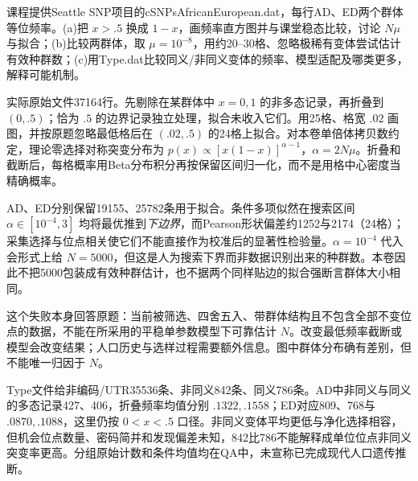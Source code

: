 \begin{exercise}
课程提供Seattle SNP项目的cSNPsAfricanEuropean.dat，每行AD、ED两个群体等位频率。(a)把 $x>.5$ 换成 $1-x$，画频率直方图并与课堂稳态比较，讨论 $N\mu$ 与拟合；(b)比较两群体，取 $\mu=10^{-8}$，用约20--30格、忽略极稀有变体尝试估计有效种群数；(c)用Type.dat比较同义/非同义变体的频率、模型适配及哪类更多，解释可能机制。
\end{exercise}
\begin{solution}
实际原始文件37164行。先剔除在某群体中 $x=0,1$ 的非多态记录，再折叠到 $(0,.5)$；恰为 $.5$ 的边界记录独立处理，拟合未收入它们。用25格、格宽 $.02$ 画图，并按原题忽略最低格后在 $(.02,.5)$ 的24格上拟合。对本卷单倍体拷贝数约定，理论零选择对称突变分布为 $p(x)\propto[x(1-x)]^{\alpha-1}$，$\alpha=2N\mu$。折叠和截断后，每格概率用Beta分布积分再按保留区间归一化，而不是用格中心密度当精确概率。
\begin{center}\end{center}
AD、ED分别保留19155、25782条用于拟合。条件多项似然在搜索区间 $\alpha\in[10^{-4},3]$ 均将最优推到\emph{下边界}，而Pearson形状偏差约1252与2174（24格）；采集选择与位点相关使它们不能直接作为校准后的显著性检验量。$\alpha=10^{-4}$ 代入会形式上给 $N=5000$，但这是人为搜索下界而非数据识别出来的种群数。本卷因此不把5000包装成有效种群估计，也不据两个同样贴边的拟合强断言群体大小相同。

这个失败本身回答原题：当前被筛选、四舍五入、带群体结构且不包含全部不变位点的数据，不能在所采用的平稳单参数模型下可靠估计 $N$。改变最低频率截断或模型会改变结果；人口历史与选样过程需要额外信息。图中群体分布确有差别，但不能唯一归因于 $N$。

Type文件给非编码/UTR35536条、非同义842条、同义786条。AD中非同义与同义的多态记录427、406，折叠频率均值分别 $.1322,.1558$；ED对应809、768与 $.0870,.1088$，这里仍按 $0<x<.5$ 口径。非同义变体平均更低与净化选择相容，但机会位点数量、密码简并和发现偏差未知，842比786不能解释成单位位点非同义突变率更高。分组原始计数和条件均值均在QA中，未宣称已完成现代人口遗传推断。


\end{solution}
